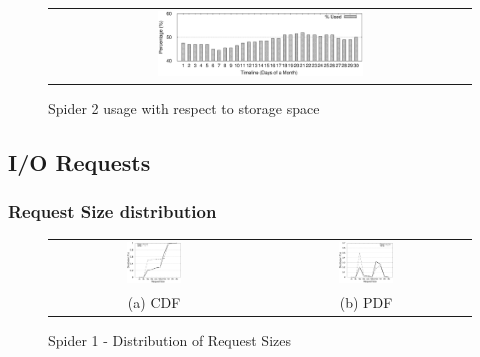 \begin{figure}[!thb]
\begin{center}
\begin{tabular}{c}
{\includegraphics[width=0.5\textwidth]{./figs/storageUsage.eps}}\\
\end{tabular}
\vspace{-0.1in}
\caption{Spider 2 usage with respect to storage space}
\label{fig:storageUsage}
\end{center}
\end{figure}


\subsection{I/O Requests}
\subsubsection{Request Size distribution}



\begin{figure}[!t]
\begin{center}
\begin{tabular}{cc}
\hspace*{-1cm}                                                           
{\includegraphics[width=0.27\textwidth]{./figs/spider1-reqSizeCDF.eps}}&
\hspace{-2mm}
{\includegraphics[width=0.27\textwidth]{./figs/spider1-reqSizePDF.eps}}\\
\small (a) CDF & \small(b) PDF \\
\end{tabular}
\vspace{-0.1in}
\captionsetup{justification=centering}
\caption{Spider 1 - Distribution of Request Sizes}
\label{fig:spider1-reqsizedist}
\end{center}
\end{figure}

